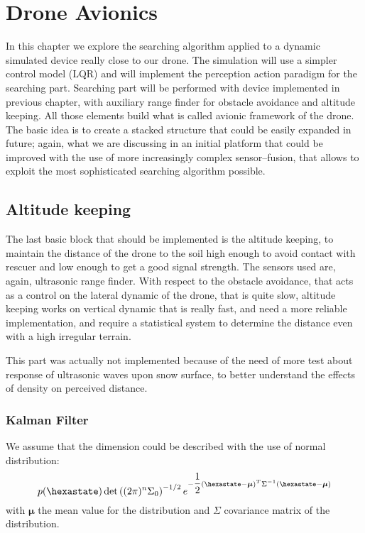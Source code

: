 \chapter{Drone Avionics}
\minitoc
\thispagestyle{plain}

\renewcommand{\arraystretch}{1.75}

In this chapter we explore the searching algorithm applied to a dynamic simulated device really close to our drone. The simulation will use a simpler control model (LQR) and will implement the perception action paradigm for the searching part. Searching part will be performed with device implemented in previous chapter, with auxiliary range finder for obstacle avoidance and altitude keeping. All those elements build what is called avionic framework of the drone. The basic idea is to create a stacked structure that could be easily expanded in future; again, what we are discussing in an initial platform that could be improved with the use of more increasingly complex sensor--fusion, that allows to exploit the most sophisticated searching algorithm possible. 





\section{Altitude keeping}
The last basic block that should be implemented is the altitude keeping, to maintain the distance of the drone to the soil high enough to avoid contact with rescuer and low enough to get a good signal strength. The sensors used are, again, ultrasonic range finder. With respect to the obstacle avoidance, that acts as a control on the lateral dynamic of the drone, that is quite slow, altitude keeping works on vertical dynamic that is really fast, and need a more reliable implementation, and require a statistical system to determine the distance even with a high irregular terrain.

This part was actually not implemented because of the need of more test about response of ultrasonic waves upon snow surface, to better understand the effects of density on perceived distance.

\subsection{Kalman Filter}
We assume that the dimension could be described with the use of normal distribution:
\begin{equation}
p(\hexastate) \det\braces{(2\pi)^{n}\Sigma_0}^{-1/2} e^{-\dfrac{1}{2}\braces{\hexastate - \boldsymbol{\mu}}^T \Sigma^{-1}\braces{\hexastate - \boldsymbol{\mu}}}
\end{equation}
with ${\boldsymbol{\mu}}$ the mean value for the distribution and ${\Sigma}$ covariance matrix of the distribution.

